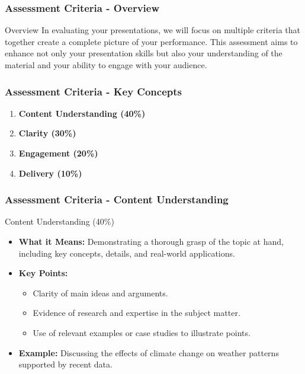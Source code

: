 \documentclass[aspectratio=169]{beamer}
\begin{document}
\begin{frame}[fragile]
    \frametitle{Assessment Criteria - Overview}
    \begin{block}{Overview}
        In evaluating your presentations, we will focus on multiple criteria that together create a complete picture of your performance. This assessment aims to enhance not only your presentation skills but also your understanding of the material and your ability to engage with your audience.
    \end{block}
\end{frame}

\begin{frame}[fragile]
    \frametitle{Assessment Criteria - Key Concepts}
    \begin{enumerate}
        \item \textbf{Content Understanding (40\%)} 
        \item \textbf{Clarity (30\%)} 
        \item \textbf{Engagement (20\%)} 
        \item \textbf{Delivery (10\%)} 
    \end{enumerate}
\end{frame}

\begin{frame}[fragile]
    \frametitle{Assessment Criteria - Content Understanding}
    \begin{block}{Content Understanding (40\%)}
        \begin{itemize}
            \item \textbf{What it Means:} Demonstrating a thorough grasp of the topic at hand, including key concepts, details, and real-world applications.
            \item \textbf{Key Points:}
            \begin{itemize}
                \item Clarity of main ideas and arguments.
                \item Evidence of research and expertise in the subject matter.
                \item Use of relevant examples or case studies to illustrate points.
            \end{itemize}
            \item \textbf{Example:} Discussing the effects of climate change on weather patterns supported by recent data.
        \end{itemize}
    \end{block}
\end{frame}
\end{document}
